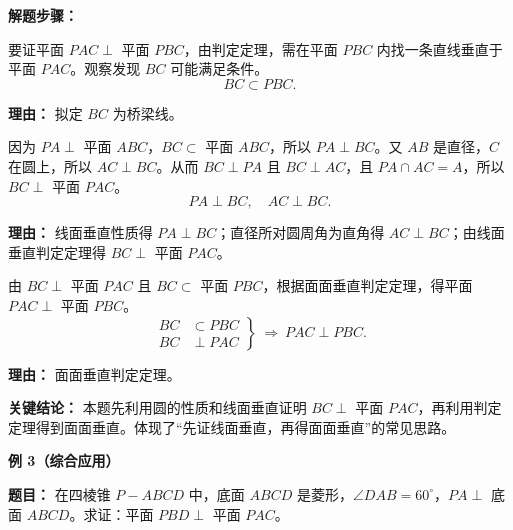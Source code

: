 \begin{examplebox}
	\medskip
	\textbf{\textcolor{CExample}{解题步骤：}}
	\begin{description}[style=nextline, leftmargin=2.8em, labelsep=0.5em, itemsep=0.45em]
		\item[\textbf{第一步（目标分析）：}]
			要证平面 $PAC\perp$ 平面 $PBC$，由判定定理，需在平面 $PBC$ 内找一条直线垂直于平面 $PAC$。观察发现 $BC$ 可能满足条件。
			\[
				BC\subset PBC.
			\]
			\par\textbf{理由：} 拟定 $BC$ 为桥梁线。
		\item[\textbf{第二步（证明线面垂直）：}]
			因为 $PA\perp$ 平面 $ABC$，$BC\subset$ 平面 $ABC$，所以 $PA\perp BC$。又 $AB$ 是直径，$C$ 在圆上，所以 $AC\perp BC$。从而 $BC\perp PA$ 且 $BC\perp AC$，且 $PA\cap AC=A$，所以 $BC\perp$ 平面 $PAC$。
			\[
				PA\perp BC,\quad AC\perp BC.
			\]
			\par\textbf{理由：} 线面垂直性质得 $PA\perp BC$；直径所对圆周角为直角得 $AC\perp BC$；由线面垂直判定定理得 $BC\perp$ 平面 $PAC$。
		\item[\textbf{第三步（套用定理）：}]
			由 $BC\perp$ 平面 $PAC$ 且 $BC\subset$ 平面 $PBC$，根据面面垂直判定定理，得平面 $PAC\perp$ 平面 $PBC$。
			\[
				\left.
				\begin{aligned}
					BC &\subset PBC\\BC &\perp PAC
			\end{aligned}
				\right\}\ \Rightarrow\ PAC\perp PBC.
			\]
			\par\textbf{理由：} 面面垂直判定定理。
	\end{description}

	\medskip
	\textbf{\textcolor{CExample}{关键结论：}}
	本题先利用圆的性质和线面垂直证明 $BC\perp$ 平面 $PAC$，再利用判定定理得到面面垂直。体现了“先证线面垂直，再得面面垂直”的常见思路。

	\medskip
	\textbf{\textcolor{CExample}{例 3（综合应用）}}

	\medskip
	\textbf{\textcolor{CExample}{题目：}}
	在四棱锥 $P-ABCD$ 中，底面 $ABCD$ 是菱形，$\angle DAB=60^\circ$，$PA\perp$ 底面 $ABCD$。求证：平面 $PBD\perp$ 平面 $PAC$。


\end{examplebox}
